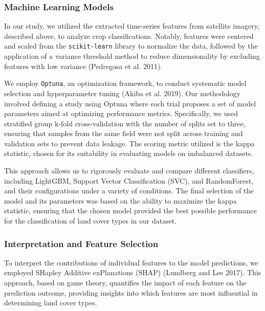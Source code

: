 \documentclass[
]{article}
\begin{document}
\hypertarget{machine-learning-models}{%
\subsubsection{Machine Learning Models}\label{machine-learning-models}}

In our study, we utilized the extracted time-series features from
satellite imagery, described above, to analyze crop classifications.
Notably, features were centered and scaled from the
\texttt{scikit-learn} library to normalize the data, followed by the
application of a variance threshold method to reduce dimensionality by
excluding features with low variance (Pedregosa et al. 2011).

We employ \texttt{Optuna}, an optimization framework, to conduct
systematic model selection and hyperparameter tuning (Akiba et al.
2019). Our methodology involved defining a study using Optuna where each
trial proposes a set of model parameters aimed at optimizing performance
metrics. Specifically, we used stratified group k-fold cross-validation
with the number of splits set to three, ensuring that samples from the
same field were not split across training and validation sets to prevent
data leakage. The scoring metric utilized is the kappa statistic, chosen
for its suitability in evaluating models on imbalanced datasets.

This approach allows us to rigorously evaluate and compare different
classifiers, including LightGBM, Support Vector Classification (SVC),
and RandomForest, and their configurations under a variety of
conditions. The final selection of the model and its parameters was
based on the ability to maximize the kappa statistic, ensuring that the
chosen model provided the best possible performance for the
classification of land cover types in our dataset.

\hypertarget{interpretation-and-feature-selection}{%
\subsubsection{Interpretation and Feature
Selection}\label{interpretation-and-feature-selection}}

To interpret the contributions of individual features to the model
predictions, we employed SHapley Additive exPlanations (SHAP) (Lundberg
and Lee 2017). This approach, based on game theory, quantifies the
impact of each feature on the prediction outcome, providing insights
into which features are most influential in determining land cover
types.
\end{document}
